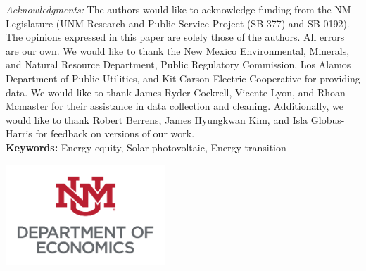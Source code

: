 \begin{titlepage}
\begin{center}
\begin{flushleft}
    \textit{Acknowledgments:} The authors would like to acknowledge funding from the NM Legislature (UNM Research and Public Service Project (SB 377) and SB 0192). The opinions expressed in this paper are solely those of the authors. All errors are our own. We would like to thank the New Mexico Environmental, Minerals, and Natural Resource Department, Public Regulatory Commission, Los Alamos Department of Public Utilities, and Kit Carson Electric Cooperative for providing data. We would like to thank James Ryder Cockrell, Vicente Lyon, and Rhoan Mcmaster for their assistance in data collection and cleaning. Additionally, we would like to thank Robert Berrens, James Hyungkwan Kim, and Isla Globus-Harris for feedback on versions of our work.  \\

    \vspace{1em}
\textbf{Keywords:} Energy equity, Solar photovoltaic, Energy transition

\end{flushleft}
  \vspace{1em}

\includegraphics[width = 6cm]{figures/unm.png}






\end{center}

\end{titlepage}

